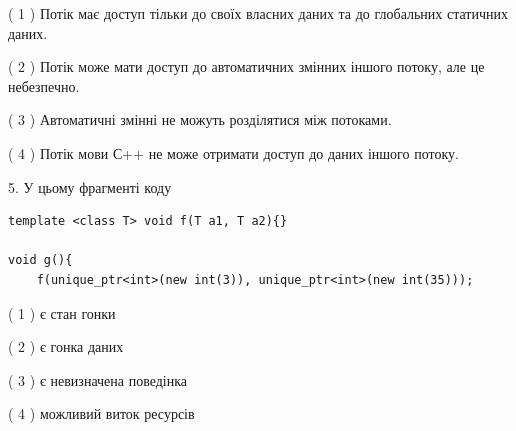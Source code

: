 \documentclass[12pt, ukrainian]{article}
\begin{document}
\begin {large}
{( 1 ) Потік має доступ тільки до своїх власних даних та до глобальних статичних даних.%

( 2 ) Потік може мати доступ до автоматичних змінних іншого потоку, але це небезпечно.%

( 3 ) Автоматичні змінні не можуть розділятися між потоками.%

( 4 ) Потік мови С++ не може отримати доступ до даних іншого потоку.%


5. У цьому фрагменті коду
\begin{verbatim}
template <class T> void f(T a1, T a2){}

void g(){
    f(unique_ptr<int>(new int(3)), unique_ptr<int>(new int(35)));
\end{verbatim}

( 1 ) є стан гонки%

( 2 ) є гонка даних%

( 3 ) є невизначена поведінка%

( 4 ) можливий виток ресурсів%
}
\end {large}
\end{document}
